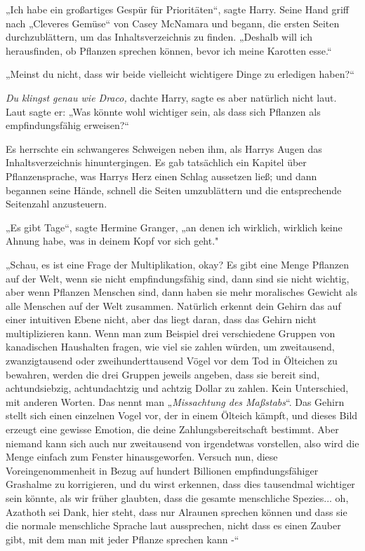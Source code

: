 {„Ich habe ein großartiges Gespür für Prioritäten“, sagte Harry. Seine Hand griff nach „Cleveres Gemüse“ von Casey McNamara und begann, die ersten Seiten durchzublättern, um das Inhaltsverzeichnis zu finden. „Deshalb will ich herausfinden, ob Pflanzen sprechen können, bevor ich meine Karotten esse.“

„Meinst du nicht, dass wir beide vielleicht wichtigere Dinge zu erledigen haben?“

\emph{Du klingst genau wie Draco,} dachte Harry, sagte es aber natürlich nicht laut.\\ Laut sagte er: „Was könnte wohl wichtiger sein, als dass sich Pflanzen als empfindungsfähig erweisen?“

Es herrschte ein schwangeres Schweigen neben ihm, als Harrys Augen das Inhaltsverzeichnis hinuntergingen. Es gab tatsächlich ein Kapitel über Pflanzensprache, was Harrys Herz einen Schlag aussetzen ließ; und dann begannen seine Hände, schnell die Seiten umzublättern und die entsprechende Seitenzahl anzusteuern.

„Es gibt Tage“, sagte Hermine Granger, „an denen ich wirklich, wirklich keine Ahnung habe, was in deinem Kopf vor sich geht."

„Schau, es ist eine Frage der Multiplikation, okay? Es gibt eine Menge Pflanzen auf der Welt, wenn sie nicht empfindungsfähig sind, dann sind sie nicht wichtig, aber wenn Pflanzen Menschen sind, dann haben sie mehr moralisches Gewicht als alle Menschen auf der Welt zusammen. Natürlich erkennt dein Gehirn das auf einer intuitiven Ebene nicht, aber das liegt daran, dass das Gehirn nicht multiplizieren kann. Wenn man zum Beispiel drei verschiedene Gruppen von kanadischen Haushalten fragen, wie viel sie zahlen würden, um zweitausend, zwanzigtausend oder zweihunderttausend Vögel vor dem Tod in Ölteichen zu bewahren, werden die drei Gruppen jeweils angeben, dass sie bereit sind, achtundsiebzig, achtundachtzig und achtzig Dollar zu zahlen. Kein Unterschied, mit anderen Worten. Das nennt man „\emph{Missachtung des Maßstabs}“. Das Gehirn stellt sich einen einzelnen Vogel vor, der in einem Ölteich kämpft, und dieses Bild erzeugt eine gewisse Emotion, die deine Zahlungsbereitschaft bestimmt. Aber niemand kann sich auch nur zweitausend von irgendetwas vorstellen, also wird die Menge einfach zum Fenster hinausgeworfen. Versuch nun, diese Voreingenommenheit in Bezug auf hundert Billionen empfindungsfähiger Grashalme zu korrigieren, und du wirst erkennen, dass dies tausendmal wichtiger sein könnte, als wir früher glaubten, dass die gesamte menschliche Spezies... oh, Azathoth sei Dank, hier steht, dass nur Alraunen sprechen können und dass sie die normale menschliche Sprache laut aussprechen, nicht dass es einen Zauber gibt, mit dem man mit jeder Pflanze sprechen kann -“

}
